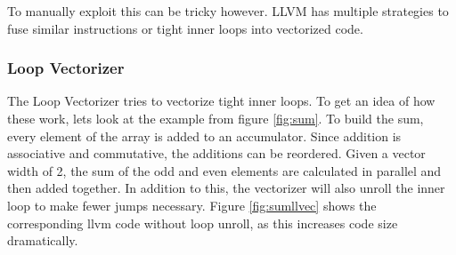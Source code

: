 \documentclass[a4paper,bibliography=totocnumbered,parskip,headsepline]{scrbook}
\begin{document}
To manually exploit this can be tricky however.
LLVM has multiple strategies to fuse similar instructions or tight inner loops into vectorized code.\cite{llvmauto}

\subsubsection{Loop Vectorizer}
The Loop Vectorizer tries to vectorize tight inner loops.
To get an idea of how these work, lets look at the example from figure \ref{fig:sum}.
To build the sum, every element of the array is added to an accumulator.
Since addition is associative and commutative, the additions can be reordered.
Given a vector width of 2, the sum of the odd and even elements are calculated in parallel and then added together.
In addition to this, the vectorizer will also unroll the inner loop to make fewer jumps necessary.
Figure \ref{fig:sumllvec} shows the corresponding llvm code without loop unroll, as this increases code size dramatically.
\end{document}
